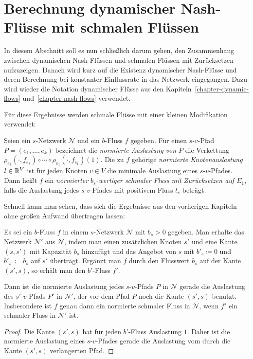 \section{Berechnung dynamischer Nash-Flüsse mit schmalen Flüssen}\label{sec-nash-flow-extension}
In diesem Abschnitt soll es nun schließlich darum gehen, den Zusammenhang zwischen dynamischen Nash-Flüssen und schmalen Flüssen mit Zurücksetzen aufzuzeigen.
Danach wird kurz auf die Existenz dynamischer Nash-Flüsse und deren Berechnung bei konstanter Einflussrate in das Netzwerk eingegangen.
Dazu wird wieder die Notation dynamischer Flüsse aus den Kapiteln~\ref{chapter-dynamic-flows} und~\ref{chapter-nash-flows} verwendet.

Für diese Ergebnisse werden schmale Flüsse mit einer kleinen Modifikation verwendet:

\begin{definition}\label{def-normalized-thin-flow}
	Seien ein $s$-Netzwerk $\mathcal{N}$ und ein $b$-Fluss $f$ gegeben.
	Für einen $s$-$v$-Pfad $P=(e_1, \dots, e_k)$ bezeichnet die \emph{normierte Auslastung von $P$} die Verkettung $\rho_{e_k}(\cdot, f_{e_k}) \circ \cdots \circ \rho_{e_1}(\cdot, f_{e_1})(1)$.
	Die zu $f$ gehörige \emph{normierte Knotenauslastung} $l\in\mathbb{R}^V$ ist für jeden Knoten $v\in V$ die minimale Auslastung eines $s$-$v$-Pfades.
	Dann heißt $f$ ein \emph{normierter $b_s$-wertiger schmaler Fluss mit Zurücksetzen auf $E_1$}, falls die Auslastung jedes $s$-$v$-Pfades mit positivem Fluss $l_v$ beträgt.
\end{definition}

Schnell kann man sehen, dass sich die Ergebnisse aus den vorherigen Kapiteln ohne großen Aufwand übertragen lassen:

\begin{proposition}
	Es sei ein $b$-Fluss $f$ in einem $s$-Netzwerk $\mathcal{N}$ mit $b_s > 0$ gegeben.
	Man erhalte das Netzwerk $\mathcal{N}'$ aus $\mathcal{N}$, indem man einen zusätzlichen Knoten $s'$ und eine Kante $(s, s')$ mit Kapazität $b_s$ hinzufügt und das Angebot von $s$ mit $b'_s \coloneq 0$ und $b'_{s'}\coloneq b_s$ auf $s'$ überträgt.
	Ergänzt man $f$ durch den Flusswert $b_s$ auf der Kante $(s', s)$, so erhält man den $b'$-Fluss $f'$.
	
	Dann ist die normierte Auslastung jedes $s$-$v$-Pfads $P$ in $\mathcal{N}$ gerade die Auslastung des $s'$-$v$-Pfads $P'$ in $\mathcal{N}'$, der vor dem Pfad $P$ noch die Kante $(s', s)$ benutzt.
	Insbesondere ist $f$ genau dann ein normierte schmaler Fluss in $\mathcal{N}$, wenn $f'$ ein schmaler Fluss in $\mathcal{N'}$ ist.
\end{proposition}
\begin{proof}
	Die Kante $(s', s)$ hat für jeden $b'$-Fluss Auslastung $1$.
	Daher ist die normierte Auslastung eines $s$-$v$-Pfades gerade die Auslastung vom durch die Kante $(s', s)$ verlängerten Pfad.
\end{proof}

